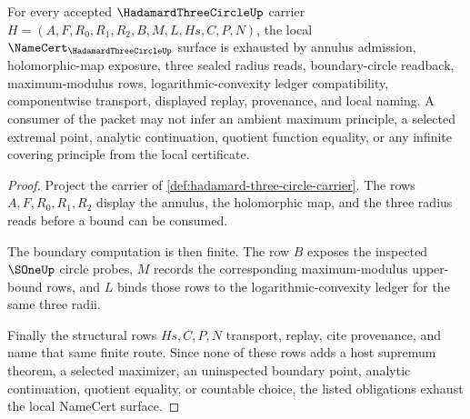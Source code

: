 \begin{theorem}
\label{thm:hadamard-three-circle-namecert-obligations}
For every accepted $\HadamardThreeCircleUp$ carrier $H=(A,F,R_0,R_1,R_2,B,M,L,Hs,C,P,N)$, the local $\NameCert_{\HadamardThreeCircleUp}$ surface is exhausted by annulus admission, holomorphic-map exposure, three sealed radius reads, boundary-circle readback, maximum-modulus rows, logarithmic-convexity ledger compatibility, componentwise transport, displayed replay, provenance, and local naming. A consumer of the packet may not infer an ambient maximum principle, a selected extremal point, analytic continuation, quotient function equality, or any infinite covering principle from the local certificate.
\end{theorem}
\begin{proof}
Project the carrier of \autoref{def:hadamard-three-circle-carrier}. The rows $A,F,R_0,R_1,R_2$ display the annulus, the holomorphic map, and the three radius reads before a bound can be consumed.

The boundary computation is then finite. The row $B$ exposes the inspected $\SOneUp$ circle probes, $M$ records the corresponding maximum-modulus upper-bound rows, and $L$ binds those rows to the logarithmic-convexity ledger for the same three radii.

Finally the structural rows $Hs,C,P,N$ transport, replay, cite provenance, and name that same finite route. Since none of these rows adds a host supremum theorem, a selected maximizer, an uninspected boundary point, analytic continuation, quotient equality, or countable choice, the listed obligations exhaust the local NameCert surface.
\end{proof}


